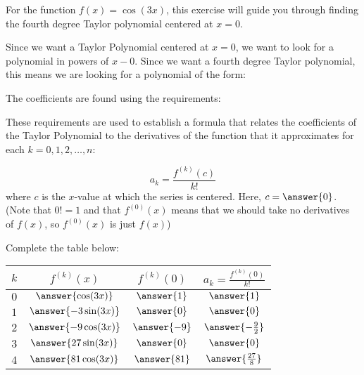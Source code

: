 \documentclass{ximera}
\author{Jim Talamo}
\begin{document}
\begin{exercise}
For the function $f(x) = \cos(3x)$, this exercise will guide you through finding the fourth degree Taylor polynomial centered at $x=0$. 

Since we want a Taylor Polynomial centered at $x=0$, we want to look for a polynomial in powers of $x-0$.  Since we want a fourth degree Taylor polynomial, this means we are looking for a polynomial of the form:

\begin{multipleChoice}
\end{multipleChoice} 

The coefficients are found using the requirements:

\begin{selectAll}
\end{selectAll}

These requirements are used to establish a formula that relates the coefficients of the Taylor Polynomial to the derivatives of the function that it approximates for each $k=0,1,2,\ldots,n$:

\[
a_k = \frac{f^{(k)}(c)}{k!}
\]
where $c$ is the $x$-value at which the series is centered.  Here, $c=\answer{0}$.
(Note that $0!=1$ and that $f^{(0)}(x)$ means that we should take no derivatives of $f(x)$, so $f^{(0)}(x)$ is just $f(x)$)

\begin{exercise}
Complete the table below:

\begin{tabular}{|c|c|c|c|}
\hline
$k$ \quad & \quad \quad $f^{(k)}(x)$  \quad \quad & \quad \quad $f^{(k)}(0)$ \quad \quad & \quad \quad $a_k = \frac{f^{(k)}(0)}{k!}$ \quad \quad \\
\hline 
$0$ \quad & \quad \quad $\answer{\cos(3x)}$  \quad \quad & \quad \quad $\answer{1}$ \quad \quad  & \quad \quad $\answer{1}$ \quad \quad \\
\hline
$1$ \quad & \quad \quad $\answer{-3\sin(3x)}$ \quad \quad & \quad \quad $\answer{0}$ \quad \quad & \quad \quad  $\answer{0}$ \quad \quad  \\
\hline
$2$ \quad & \quad \quad $\answer{-9\cos(3x)}$ \quad \quad & \quad \quad $\answer{-9}$ \quad \quad & \quad \quad  $\answer{-\frac{9}{2}}$ \quad \quad  \\
\hline
$3$ \quad & \quad \quad $\answer{27\sin(3x)}$ \quad \quad & \quad \quad $\answer{0}$ \quad \quad & \quad \quad  $\answer{0}$ \quad \quad  \\
\hline
$4$ \quad & \quad \quad $\answer{81\cos(3x)}$ \quad \quad & \quad \quad $\answer{81}$ \quad \quad & \quad \quad  $\answer{\frac{27}{8}}$ \quad \quad  \\
\hline
\end{tabular}



\end{exercise}
\end{exercise}
\end{document}

